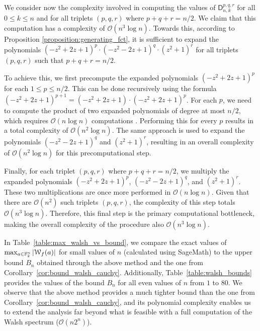 \documentclass[11pt]{llncs}
\begin{document}
We consider now the complexity involved in computing the values of $\mathsf{D}_{n,k}^{p,q,r}$ for all $0 \leq k \leq n$ and for all triplets $(p,q,r)$ where $p+q+r=n/2$. We claim that this computation has a complexity of $\mathcal{O}(n^3 \log n)$. Towards this, according to Proposition \ref{proposition:generating_fct}, it is sufficient to expand the polynomials $(-z^2 + 2z + 1)^p \cdot (-z^2 - 2z + 1)^q \cdot (z^2 + 1)^r$ for all triplets $(p,q,r)$ such that $p+q+r=n/2$.

To achieve this, we first precompute the expanded polynomials $(-z^2 + 2z + 1)^p$ for each $1 \leq p \leq n/2$. This can be done recursively using the formula $(-z^2 + 2z + 1)^{p+1} = (-z^2 + 2z + 1) \cdot (-z^2 + 2z + 1)^p$. For each $p$, we need to compute the product of two expanded polynomials of degree at most $n/2$, which requires $\mathcal{O}(n \log n)$ computations . Performing this for every $p$ results in a total complexity of $\mathcal{O}(n^2 \log n)$. The same approach is used to expand the polynomials $(-z^2 - 2z + 1)^q$ and $(z^2 + 1)^r$, resulting in an overall complexity of $\mathcal{O}(n^2 \log n)$ for this precomputational step.

Finally, for each triplet $(p,q,r)$ where $p+q+r=n/2$, we multiply the expanded polynomials $(-z^2 + 2z + 1)^p$, $(-z^2 - 2z + 1)^q$, and $(z^2 + 1)^r$. These two multiplications are once more performed in $\mathcal{O}(n \log n)$. Given that there are $\mathcal{O}(n^2)$ such triplets $(p,q,r)$, the complexity of this step totals $\mathcal{O}(n^3 \log n)$. Therefore, this final step is the primary computational bottleneck, making the overall complexity of the procedure also $\mathcal{O}(n^3 \log n)$.







In Table~\ref{table:max_walsh_vs_bound}, we compare the exact values of $\max_{a\in\mathbb F_2^n}|\mathcal W_{f}(a)|$ for small values of $n$ (calculated using \textsf{SageMath}) to the upper bound $B_n$ obtained through the above method and the one from Corollary~\ref{cor:bound_walsh_cauchy}. 
Additionally, Table~\ref{table:walsh_bounds} provides the values of the bound $B_n$ for all even values of $n$ from $1$ to $80$.
We observe that the above method provides a much tighter bound than the one from Corollary~\ref{cor:bound_walsh_cauchy}, and its polynomial complexity enables us to extend the analysis far beyond what is feasible with a full computation of the Walsh spectrum (\( \mathcal{O}(n 2^n) \)).
\end{document}
